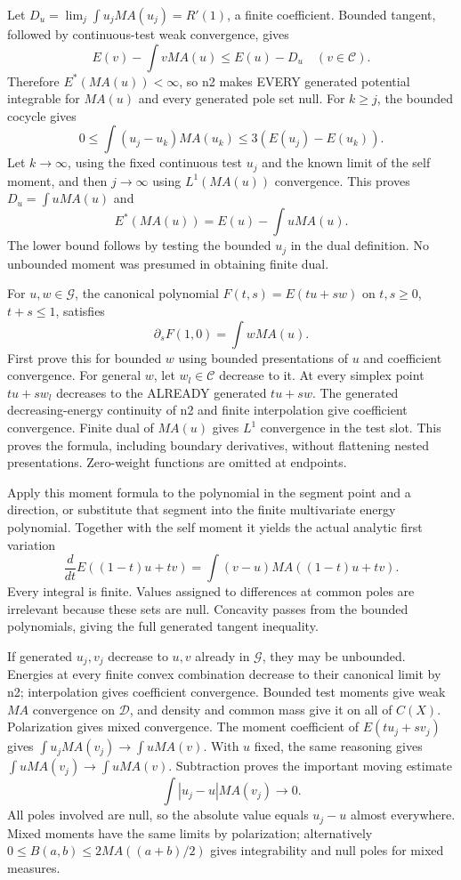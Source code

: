 \documentclass[11pt]{article}
\begin{document}
Let $D_u=\lim_j\int u_jMA(u_j)=R'(1)$, a finite coefficient. Bounded tangent, followed by continuous-test weak convergence, gives
\[
 E(v)-\int vMA(u)\le E(u)-D_u\quad(v\in\mathcal C).
\]
Therefore $E^*(MA(u))<\infty$, so n2 makes EVERY generated potential integrable for $MA(u)$ and every generated pole set null. For $k\ge j$, the bounded cocycle gives
\[
 0\le\int(u_j-u_k)MA(u_k)\le3(E(u_j)-E(u_k)).
\]
Let $k\to\infty$, using the fixed continuous test $u_j$ and the known limit of the self moment, and then $j\to\infty$ using $L^1(MA(u))$ convergence. This proves $D_u=\int uMA(u)$ and
\[
 E^*(MA(u))=E(u)-\int uMA(u).
\]
The lower bound follows by testing the bounded $u_j$ in the dual definition. No unbounded moment was presumed in obtaining finite dual.

For $u,w\in\mathcal G$, the canonical polynomial $F(t,s)=E(tu+sw)$ on $t,s\ge0$, $t+s\le1$, satisfies
\[
 \partial_sF(1,0)=\int wMA(u).
\]
First prove this for bounded $w$ using bounded presentations of $u$ and coefficient convergence. For general $w$, let $w_l\in\mathcal C$ decrease to it. At every simplex point $tu+sw_l$ decreases to the ALREADY generated $tu+sw$. The generated decreasing-energy continuity of n2 and finite interpolation give coefficient convergence. Finite dual of $MA(u)$ gives $L^1$ convergence in the test slot. This proves the formula, including boundary derivatives, without flattening nested presentations. Zero-weight functions are omitted at endpoints.

Apply this moment formula to the polynomial in the segment point and a direction, or substitute that segment into the finite multivariate energy polynomial. Together with the self moment it yields the actual analytic first variation
\[
 \frac{d}{dt}E((1-t)u+tv)=\int(v-u)MA((1-t)u+tv).
\]
Every integral is finite. Values assigned to differences at common poles are irrelevant because these sets are null. Concavity passes from the bounded polynomials, giving the full generated tangent inequality.

If generated $u_j,v_j$ decrease to $u,v$ already in $\mathcal G$, they may be unbounded. Energies at every finite convex combination decrease to their canonical limit by n2; interpolation gives coefficient convergence. Bounded test moments give weak $MA$ convergence on $\mathcal D$, and density and common mass give it on all of $C(X)$. Polarization gives mixed convergence. The moment coefficient of $E(tu_j+sv_j)$ gives $\int u_jMA(v_j)\to\int uMA(v)$. With $u$ fixed, the same reasoning gives $\int uMA(v_j)\to\int uMA(v)$. Subtraction proves the important moving estimate
\[
 \int|u_j-u|MA(v_j)\longrightarrow0.
\]
All poles involved are null, so the absolute value equals $u_j-u$ almost everywhere. Mixed moments have the same limits by polarization; alternatively $0\le B(a,b)\le2MA((a+b)/2)$ gives integrability and null poles for mixed measures.
\end{document}
